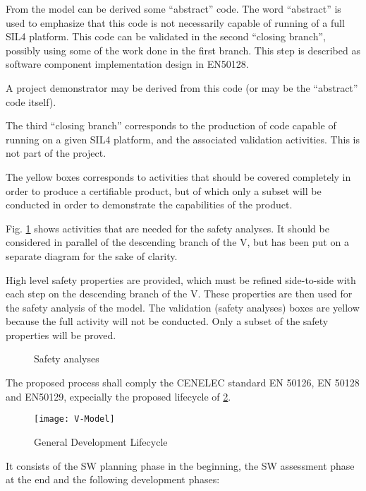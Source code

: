 From the model can be derived some ``abstract'' code. The word ``abstract'' is used to emphasize that 
this code is not necessarily capable of running of a full SIL4 platform. This code can be validated 
in the second ``closing branch'', possibly using some of the work done in the first branch. 
This step  is described as software component implementation design in EN50128.

A project demonstrator may be derived from this code (or may be the ``abstract'' code itself).

The third ``closing branch'' corresponds to the production of code capable of running on a 
given SIL4 platform, and the associated validation activities. This is not part of the project.

The yellow boxes corresponds to activities that should be covered completely in order to produce 
a certifiable product, but of which only a subset will be conducted in order to demonstrate the 
capabilities of the product.

 
Fig. \ref{fig:safety_process} shows activities that are needed for the safety analyses. It should 
be considered in parallel of the descending branch of the V, but has been put on a separate diagram for
the sake of clarity.

High level safety properties are provided, which must be refined side-to-side with each step on the 
descending branch of the V. These properties are then used for the safety analysis of the model. The 
validation (safety analyses) boxes are yellow because the full activity will not be conducted. Only 
a subset of the safety properties will be proved.

\begin{figure}
  \centering
  \caption{Safety analyses}
  \label{fig:safety_process}
\end{figure}



The proposed process shall comply the CENELEC standard EN 50126, EN 50128  and EN50129, expecially the proposed lifecycle of \ref{fig:develop-lifecycle-cenelec}.


\begin{figure}[ht]
  \centering
  \texttt{[image: V-Model]}
  \caption{General Development Lifecycle~\cite{EN-50128}}
  \label{fig:develop-lifecycle-cenelec}
\end{figure}


 It consists of the SW planning phase in the beginning, the SW assessment phase at
the end and the following development phases:

